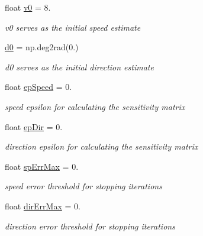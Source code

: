\begin{DoxyCompactItemize}
\item 
float \mbox{\hyperlink{classvisualization__manager___d_j_1_1_visualization_manager_1_1params_ab40f310196a7379aba6221391989f89f}{v0}} = 8.
\begin{DoxyCompactList}\small\item\em v0 serves as the initial speed estimate \end{DoxyCompactList}\item 
\mbox{\hyperlink{classvisualization__manager___d_j_1_1_visualization_manager_1_1params_ae89c909d412f7f049eeee5203416f69e}{d0}} = np.\+deg2rad(0.)
\begin{DoxyCompactList}\small\item\em d0 serves as the initial direction estimate \end{DoxyCompactList}\item 
float \mbox{\hyperlink{classvisualization__manager___d_j_1_1_visualization_manager_1_1params_abee136d44b019dffd2f4c699dcdfd1bf}{ep\+Speed}} = 0.
\begin{DoxyCompactList}\small\item\em speed epsilon for calculating the sensitivity matrix \end{DoxyCompactList}\item 
float \mbox{\hyperlink{classvisualization__manager___d_j_1_1_visualization_manager_1_1params_ad36d386a8348649bec1bef88f735e08c}{ep\+Dir}} = 0.
\begin{DoxyCompactList}\small\item\em direction epsilon for calculating the sensitivity matrix \end{DoxyCompactList}\item 
float \mbox{\hyperlink{classvisualization__manager___d_j_1_1_visualization_manager_1_1params_a6d8b791c33246961acd2b32cf09e5dd8}{sp\+Err\+Max}} = 0.
\begin{DoxyCompactList}\small\item\em speed error threshold for stopping iterations \end{DoxyCompactList}\item 
float \mbox{\hyperlink{classvisualization__manager___d_j_1_1_visualization_manager_1_1params_a7d324e588b5a6434a69576d7940c8b4e}{dir\+Err\+Max}} = 0.
\begin{DoxyCompactList}\small\item\em direction error threshold for stopping iterations \end{DoxyCompactList}\item 

\end{DoxyCompactItemize}

